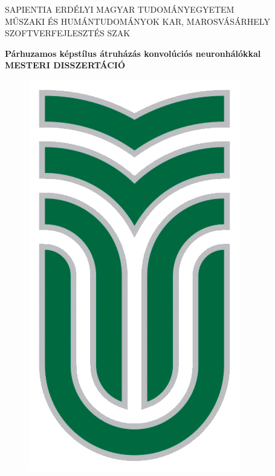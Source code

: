 \documentclass[12pt, a4paper, oneside]{book}
\theoremstyle{tetel}
\begin{document}

\newpage
\thispagestyle{empty}
\begin{center}
    \Large SAPIENTIA ERDÉLYI MAGYAR TUDOMÁNYEGYETEM\\
    \Large MŰSZAKI ÉS HUMÁNTUDOMÁNYOK KAR, MAROSVÁSÁRHELY\\
    \Large SZOFTVERFEJLESZTÉS SZAK\\
\end{center}

\begin{center}
 	\vspace{2cm}\LARGE \textbf{Párhuzamos képstílus átruházás konvolúciós neuronhálókkal}\\
	 \vspace{1cm}\LARGE \textbf{MESTERI DISSZERTÁCIÓ}\\
\end{center}

\vspace{2cm}
\begin{figure}[htb]
\begin{center}
\includegraphics{sapientia_logo.png}
\end{center}
\end{figure}
\end{document}
